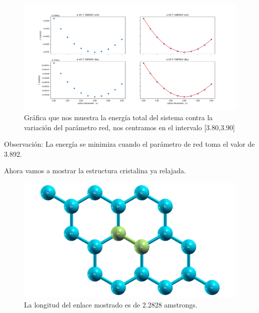 \begin{figure}[H]
    \centering
    \includegraphics[scale=0.42]{images_siliceno/lattice_parameter_second_vs_T_energy.png}
    \caption{Gráfica que nos muestra la energía total del sistema contra la variación del parámetro red, nos centramos en el intervalo [3.80,3.90]}
\end{figure}

\noindent
Observación: La energía se minimiza cuando el parámetro de red toma el valor de 3.892.

\vspace{0.5cm}

\noindent
Ahora vamos a mostrar la estructura cristalina ya relajada.

\vspace{0.5cm}

\begin{figure}[H]
    \centering
    \includegraphics[scale=0.34]{images_siliceno/longitud_enlace_2_2828_amstrongs.png}
    \caption{La longitud del enlace mostrado es de 2.2828 amstrongs.}
\end{figure}

\vspace{0.5cm}


